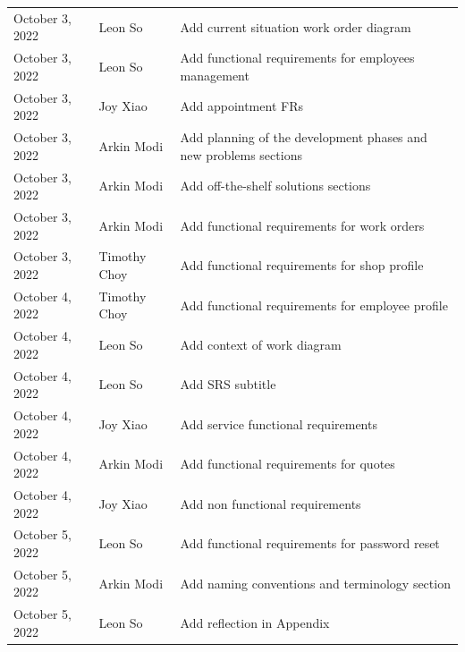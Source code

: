 \documentclass[12pt]{article}
\begin{document}
\begin{table}[H]
\begin{tabularx}{\textwidth}{llX}
		October 3, 2022    & Leon So               & Add current situation work order diagram                                           \\
		October 3, 2022    & Leon So               & Add functional requirements for employees management                               \\
		October 3, 2022    & Joy Xiao              & Add appointment FRs                                                                \\
		October 3, 2022    & Arkin Modi            & Add planning of the development phases and new problems sections                   \\
		October 3, 2022    & Arkin Modi            & Add off-the-shelf solutions sections                                               \\
		October 3, 2022    & Arkin Modi            & Add functional requirements for work orders                                        \\
		October 3, 2022    & Timothy Choy          & Add functional requirements for shop profile                                       \\
		October 4, 2022    & Timothy Choy          & Add functional requirements for employee profile                                   \\
		October 4, 2022    & Leon So               & Add context of work diagram                                                        \\
		October 4, 2022    & Leon So               & Add SRS subtitle                                                                   \\
		October 4, 2022    & Joy Xiao              & Add service functional requirements                                                \\
		October 4, 2022    & Arkin Modi            & Add functional requirements for quotes                                             \\
		October 4, 2022    & Joy Xiao              & Add non functional requirements                                                    \\
		October 5, 2022    & Leon So               & Add functional requirements for password reset                                     \\
		October 5, 2022    & Arkin Modi            & Add naming conventions and terminology section                                     \\
		October 5, 2022    & Leon So               & Add reflection in Appendix                                                         \\

\end{tabularx}
\end{table}
\end{document}
